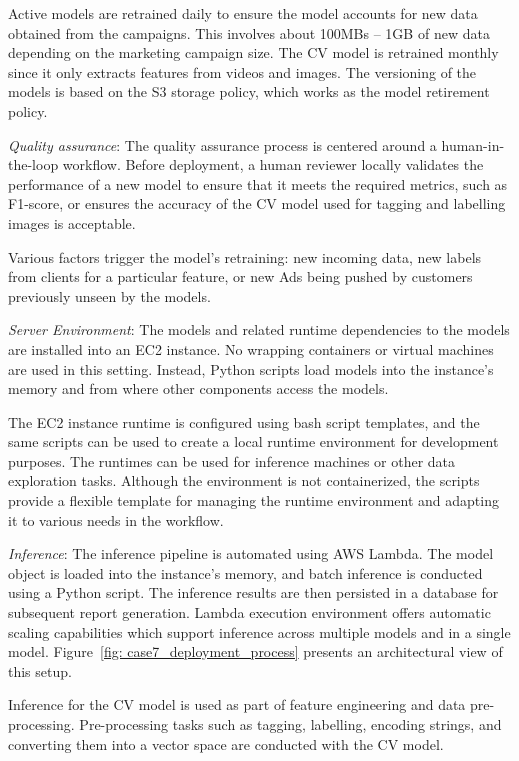 Active models are retrained daily to ensure the model accounts for new data obtained from the campaigns. This involves about 100MBs – 1GB of new data depending on the marketing campaign size. The CV model is retrained monthly since it only extracts features from videos and images. The versioning of the models is based on the S3 storage policy, which works as the model retirement policy.

\textit{Quality assurance}: The quality assurance process is centered around a human-in-the-loop workflow. Before deployment, a human reviewer locally validates the performance of a new model to ensure that it meets the required metrics, such as F1-score, or ensures the accuracy of the CV model used for tagging and labelling images is acceptable.

Various factors trigger the model's retraining: new incoming data, new labels from clients for a particular feature, or new Ads being pushed by customers previously unseen by the models.

\textit{Server Environment}: The models and related runtime dependencies to the models are installed into an EC2 instance. No wrapping containers or virtual machines are used in this setting. Instead, Python scripts load models into the instance's memory and from where other components access the models.

The EC2 instance runtime is configured using bash script templates, and the same scripts can be used to create a local runtime environment for development purposes. The runtimes can be used for inference machines or other data exploration tasks. Although the environment is not containerized, the scripts provide a flexible template for managing the runtime environment and adapting it to various needs in the workflow.

\textit{Inference}: The inference pipeline is automated using AWS Lambda. The model object is loaded into the instance's memory, and batch inference is conducted using a Python script. The inference results are then persisted in a database for subsequent report generation. Lambda execution environment offers automatic scaling capabilities which support inference across multiple models and in a single model. Figure~\ref{fig: case7_deployment_process} presents an architectural view of this setup.

Inference for the CV model is used as part of feature engineering and data pre-processing. Pre-processing tasks such as tagging, labelling, encoding strings, and converting them into a vector space are conducted with the CV model.

